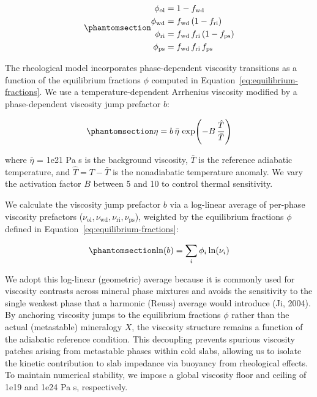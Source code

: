 \documentclass[draft,linenumbers]{agujournal2019}
\begin{document}
\begin{equation}\protect\phantomsection\label{eq:equilibrium-fractions}{\begin{aligned}
    \phi_\mathrm{ol} &= 1 - f_\mathrm{wd} \\
    \phi_\mathrm{wd} &= f_\mathrm{wd}\, (1 - f_\mathrm{ri}) \\
    \phi_\mathrm{ri} &= f_\mathrm{wd}\, f_\mathrm{ri}\, (1 - f_\mathrm{ps}) \\
    \phi_\mathrm{ps} &= f_\mathrm{wd}\, f_\mathrm{ri}\, f_\mathrm{ps}
  \end{aligned}}\end{equation}

The rheological model incorporates phase-dependent viscosity transitions
as a function of the equilibrium fractions \(\phi\) computed in
Equation~\ref{eq:equilibrium-fractions}. We use a temperature-dependent
Arrhenius viscosity modified by a phase-dependent viscosity jump
prefactor \(b\):

\begin{equation}\protect\phantomsection\label{eq:rheological-model}{\eta = b\, \bar{\eta}\, \exp\!\left(-B\,\frac{\hat{T}}{\bar{T}}\right)}\end{equation}

where \(\bar{\eta}\) = 1e21 Pa s is the background viscosity,
\(\bar{T}\) is the reference adiabatic temperature, and
\(\hat{T} = T - \bar{T}\) is the nonadiabatic temperature anomaly. We
vary the activation factor \(B\) between 5 and 10 to control thermal
sensitivity.

We calculate the viscosity jump prefactor \(b\) via a log-linear average
of per-phase viscosity prefactors
(\(\nu_\mathrm{ol}, \nu_\mathrm{wd}, \nu_\mathrm{ri}, \nu_\mathrm{ps}\)),
weighted by the equilibrium fractions \(\phi\) defined in
Equation~\ref{eq:equilibrium-fractions}:

\begin{equation}\protect\phantomsection\label{eq:rheological-jump-factor}{\ln(b) = \sum_{i} \phi_i \ln(\nu_i)}\end{equation}

We adopt this log-linear (geometric) average because it is commonly used
for viscosity contrasts across mineral phase mixtures and avoids the
sensitivity to the single weakest phase that a harmonic (Reuss) average
would introduce (Ji, 2004). By anchoring viscosity jumps to the
equilibrium fractions \(\phi\) rather than the actual (metastable)
mineralogy \(X\), the viscosity structure remains a function of the
adiabatic reference condition. This decoupling prevents spurious
viscosity patches arising from metastable phases within cold slabs,
allowing us to isolate the kinetic contribution to slab impedance via
buoyancy from rheological effects. To maintain numerical stability, we
impose a global viscosity floor and ceiling of 1e19 and 1e24 Pa s,
respectively.
\end{document}
